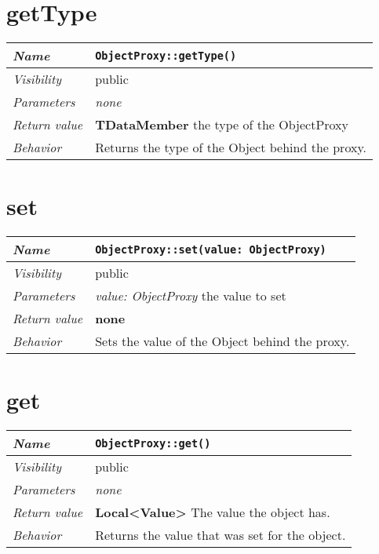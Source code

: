  \section{getType}
\begin{longtable}{p{3cm} @{\hskip 1cm} p{12cm}}
 \hline
\textit{Name} & \texttt{ObjectProxy::getType()}\\
\hline
 \textit{Visibility} & public\\
\hline
\textit{Parameters} & \textit{none}\\
\hline
\textit{Return value} & \textbf{TDataMember} the type of the ObjectProxy\\
  \hline
 \textit{Behavior} & Returns the type of the Object behind the proxy.\\
\hline
\end{longtable} \pagebreak
 \section{set}
\begin{longtable}{p{3cm} @{\hskip 1cm} p{12cm}}
 \hline
\textit{Name} & \texttt{ObjectProxy::set(value: ObjectProxy)}\\
\hline
 \textit{Visibility} & public\\
\hline
\textit{Parameters} & \textit{value: ObjectProxy} the value to set\\
\hline
\textit{Return value} & \textbf{none}\\
  \hline
 \textit{Behavior} & Sets the value of the Object behind the proxy.\\
\hline
\end{longtable} \pagebreak
 \section{get}
\begin{longtable}{p{3cm} @{\hskip 1cm} p{12cm}}
 \hline
\textit{Name} & \texttt{ObjectProxy::get()}\\
\hline
 \textit{Visibility} & public\\
\hline
\textit{Parameters} & \textit{none}\\
\hline
\textit{Return value} & \textbf{Local<Value>} The value the object has.\\
  \hline
 \textit{Behavior} & Returns the value that was set for the object.\\
\hline
\end{longtable} \pagebreak
